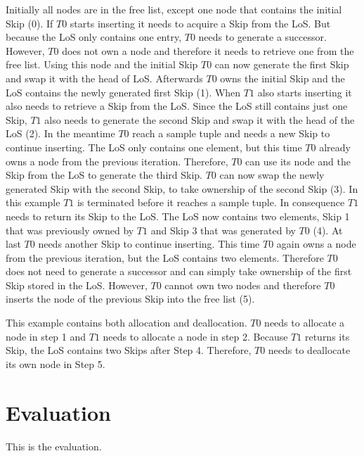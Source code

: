 \documentclass[sigconf,nonacm]{acmart}
\begin{document}
        Initially all nodes are in the free list, except one node that contains the initial Skip (0). If $T0$ starts inserting it needs to acquire a Skip from the LoS. But because the LoS only contains one entry, $T0$ needs to generate a successor. However, $T0$ does not own a node and therefore it needs to retrieve one from the free list. Using this node and the initial Skip $T0$ can now generate the first Skip and swap it with the head of LoS. Afterwards $T0$ owns the initial Skip and the LoS contains the newly generated first Skip (1). When $T1$ also starts inserting it also needs to retrieve a Skip from the LoS. Since the LoS still contains just one Skip, $T1$ also needs to generate the second Skip and swap it with the head of the LoS (2). In the meantime $T0$ reach a sample tuple and needs a new Skip to continue inserting. The LoS only contains one element, but this time $T0$ already owns a node from the previous iteration. Therefore, $T0$ can use its node and the Skip from the LoS to generate the third Skip. $T0$ can now swap the newly generated Skip with the second Skip, to take ownership of the second Skip (3). In this example $T1$ is terminated before it reaches a sample tuple. In consequence $T1$ needs to return its Skip to the LoS. The LoS now contains two elements, Skip 1 that was previously owned by $T1$ and Skip 3 that was generated by $T0$ (4). At last $T0$ needs another Skip to continue inserting. This time $T0$ again owns a node from the previous iteration, but the LoS contains two elements. Therefore $T0$ does not need to generate a successor and can simply take ownership of the first Skip stored in the LoS. However, $T0$ cannot own two nodes and therefore $T0$ inserts the node of the previous Skip into the free list (5).

        This example contains both allocation and deallocation. $T0$ needs to allocate a node in step 1 and $T1$ needs to allocate a node in step 2. Because $T1$ returns its Skip, the LoS contains two Skips after Step 4. Therefore, $T0$ needs to deallocate its own node in Step 5.


    \section{Evaluation}
        This is the evaluation.

    
    
\end{document}
